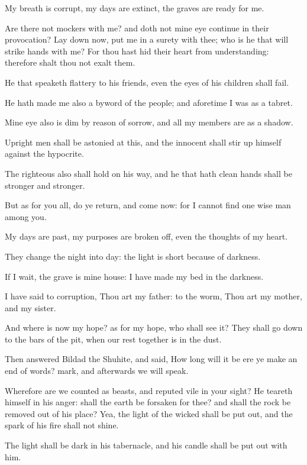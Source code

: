 \Chapter
\Verse My breath is corrupt, my days are extinct, the graves are ready for me.

\Verse Are there not mockers with me? and doth not mine eye continue in their provocation?  \Verse Lay down now, put me in a surety with thee; who is he that will strike hands with me?  \Verse For thou hast hid their heart from understanding: therefore shalt thou not exalt them.

\Verse He that speaketh flattery to his friends, even the eyes of his children shall fail.

\Verse He hath made me also a byword of the people; and aforetime I was as a tabret.

\Verse Mine eye also is dim by reason of sorrow, and all my members are as a shadow.

\Verse Upright men shall be astonied at this, and the innocent shall stir up himself against the hypocrite.

\Verse The righteous also shall hold on his way, and he that hath clean hands shall be stronger and stronger.

\Verse But as for you all, do ye return, and come now: for I cannot find one wise man among you.

\Verse My days are past, my purposes are broken off, even the thoughts of my heart.

\Verse They change the night into day: the light is short because of darkness.

\Verse If I wait, the grave is mine house: I have made my bed in the darkness.

\Verse I have said to corruption, Thou art my father: to the worm, Thou art my mother, and my sister.

\Verse And where is now my hope? as for my hope, who shall see it?  \Verse They shall go down to the bars of the pit, when our rest together is in the dust.


\Chapter
\Verse Then answered Bildad the Shuhite, and said, \Verse How long will it be ere ye make an end of words? mark, and afterwards we will speak.

\Verse Wherefore are we counted as beasts, and reputed vile in your sight?  \Verse He teareth himself in his anger: shall the earth be forsaken for thee? and shall the rock be removed out of his place?  \Verse Yea, the light of the wicked shall be put out, and the spark of his fire shall not shine.

\Verse The light shall be dark in his tabernacle, and his candle shall be put out with him.

